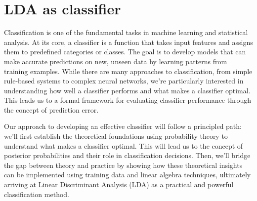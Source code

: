 \section{LDA as classifier}

Classification is one of the fundamental tasks in machine learning and statistical analysis. At its core, a classifier is a function that takes input features and assigns them to predefined categories or classes. The goal is to develop models that can make accurate predictions on new, unseen data by learning patterns from training examples. While there are many approaches to classification, from simple rule-based systems to complex neural networks, we're particularly interested in understanding how well a classifier performs and what makes a classifier optimal. This leads us to a formal framework for evaluating classifier performance through the concept of prediction error.

Our approach to developing an effective classifier will follow a principled path: we'll first establish the theoretical foundations using probability theory to understand what makes a classifier optimal. This will lead us to the concept of posterior probabilities and their role in classification decisions. Then, we'll bridge the gap between theory and practice by showing how these theoretical insights can be implemented using training data and linear algebra techniques, ultimately arriving at Linear Discriminant Analysis (LDA) as a practical and powerful classification method.
